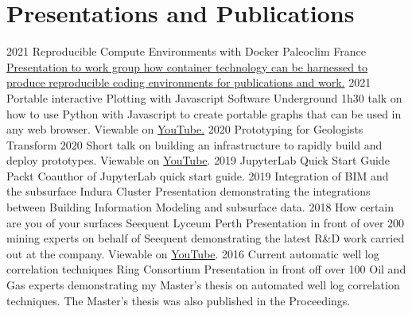 \documentclass[]{friggeri-cv}
\begin{document}
\begin{entrylist}

\end{entrylist}
\vspace*{\fill}
\newpage
\vspace*{\fill}
\section{Presentations and Publications}
\begin{entrylist}
	\entry
	{2021}
	{Reproducible Compute Environments with Docker}
	{Paleoclim France}
	{\href{https://wesleythegeolien.github.io/Presentations/docker_reproducible_envs/index.html}{Presentation to work group how container technology can be harnessed to produce reproducible coding environments for publications and work.}}
	\entry
	{2021}
	{Portable interactive Plotting with Javascript}
	{Software Underground}
	{1h30 talk on how to use Python with Javascript to create portable graphs that can be used in any web browser. Viewable on \href{https://www.youtube.com/watch?v=j\_4wkMzGvKs}{YouTube.}}
	\entry
	{2020}
	{Prototyping for Geologists}
	{Transform 2020}
	{Short talk on building an infrastructure to rapidly build and deploy prototypes.
	Viewable on \href{https://youtu.be/rUbvueIF5f8?t=4130}{YouTube}.}
	\entry
	{2019}
	{JupyterLab Quick Start Guide}
	{Packt}
	{Coauthor of JupyterLab quick start guide.}
	\entry
	{2019}
	{Integration of BIM and the subsurface}
	{Indura Cluster}
	{Presentation demonstrating the integrations between Building Information Modeling and subsurface data.}
	\entry
	{2018}
	{How certain are you of your surfaces}
	{Seequent Lyceum Perth}
	{Presentation in front of over 200 mining experts on behalf of Seequent demonstrating the latest R\&D work carried out at the company. Viewable on \href{https://www.youtube.com/watch?v=jt26J5ljlA0}{YouTube}.}
	\entry
	{2016}
	{Current automatic well log correlation techniques}
	{Ring Consortium}
	{Presentation in front off over 100 Oil and Gas experts demonstrating my Master's thesis on automated well log correlation techniques. The Master's thesis was also published in the Proceedings.}
\end{entrylist}
\end{document}
